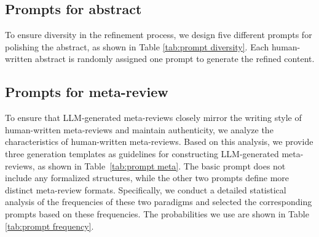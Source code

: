 \subsection{Prompts for abstract}
To ensure diversity in the refinement process, we design five different prompts for polishing the abstract, as shown in Table \ref{tab:prompt diversity}. Each human-written abstract is randomly assigned one prompt to generate the refined content.



\subsection{Prompts for meta-review}
To ensure that LLM-generated meta-reviews closely mirror the writing style of human-written meta-reviews and maintain authenticity, we analyze the characteristics of human-written meta-reviews. Based on this analysis, we provide three generation templates as guidelines for constructing LLM-generated meta-reviews, as shown in Table~\ref{tab:prompt meta}. The basic prompt does not include any formalized structures, while the other two prompts define more distinct meta-review formats.
Specifically, we conduct a detailed statistical analysis of the frequencies of these two paradigms and selected the corresponding prompts based on these frequencies. The probabilities we use are shown in Table \ref{tab:prompt frequency}.




